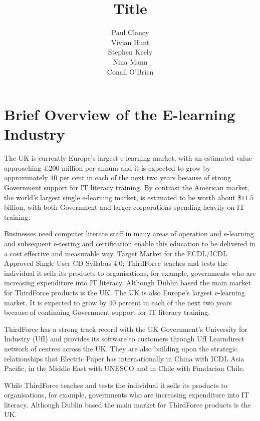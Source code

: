 \documentclass[a4paper,12pt]{article}
\begin{document}
\title{Title}

\author{Paul Clancy \\ Vivian Hunt \\ Stephen Keely \\ Nina Mann \\ Conall O'Brien}

\maketitle


\pagebreak

\section*{Brief Overview of the E-learning Industry}

The UK is currently Europe's largest e-learning market, with an
estimated value approaching £200 million per annum and it is expected
to grow by approximately 40 per cent in each of the next two years
because of strong Government support for IT literacy training.	
By contrast the American market, the world's largest single
e-learning market, is estimated to be worth about \$$11.5$ billion, with
both Government and larger corporations spending heavily on IT training.		


Businesses need computer literate staff in many areas of operation and
e-learning and subsequent e-testing and certification enable this
education to be delivered in a cost effective and measurable way.
Target Market for the ECDL/ICDL Approved Single User CD Syllabus 4.0:
ThirdForce teaches and tests the individual it sells its products to
organisations, for example, governments who are increasing expenditure
into IT literacy. Although Dublin based the main market for ThirdForce
products is the UK. The UK is also Europe's largest e-learning
market. It is expected to grow by $40$ percent in each of the next two
years because of continuing Government support for IT literacy training.

ThirdForce has a strong track record with the UK Government's
University for Industry (UfI) and provides its software to customers 
through UfI Learndirect network of centres across the UK. They are also 
building upon the strategic relationships that Electric Paper has 
internationally in China with ICDL Asia Pacific, in the Middle East with 
UNESCO and in Chile with Fundacion Chile.


While ThirdForce teaches and tests the individual it sells its products
to organisations, for example, governments who are increasing
expenditure into IT literacy. Although Dublin based the main market for
ThirdForce products is the UK.
\end{document}
